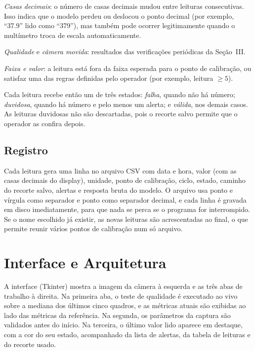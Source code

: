 \documentclass[10pt,twocolumn,letterpaper]{article}
\begin{document}
\textit{Casas decimais}: o número de casas decimais mudou entre leituras
consecutivas. Isso indica que o modelo perdeu ou deslocou o ponto decimal (por
exemplo, ``37.9'' lido como ``379''), mas também pode ocorrer legitimamente
quando o multímetro troca de escala automaticamente.

\textit{Qualidade} e \textit{câmera movida}: resultados das verificações
periódicas da Seção~III.

\textit{Faixa e valor}: a leitura está fora da faixa esperada para o ponto de
calibração, ou satisfaz uma das regras definidas pelo operador (por exemplo,
leitura $\ge 5$).

Cada leitura recebe então um de três estados: \textit{falha}, quando não há
número; \textit{duvidosa}, quando há número e pelo menos um alerta; e
\textit{válida}, nos demais casos. As leituras duvidosas não são descartadas,
pois o recorte salvo permite que o operador as confira depois.

\subsection{Registro}

Cada leitura gera uma linha no arquivo CSV com data e hora, valor (com as casas
decimais do display), unidade, ponto de calibração, ciclo, estado, caminho do
recorte salvo, alertas e resposta bruta do modelo. O arquivo usa ponto e
vírgula como separador e ponto como separador decimal, e cada linha é gravada
em disco imediatamente, para que nada se perca se o programa for interrompido.
Se o nome escolhido já existir, as novas leituras são acrescentadas ao final,
o que permite reunir vários pontos de calibração num só arquivo.

\section{Interface e Arquitetura}

A interface (Tkinter) mostra a imagem da câmera à esquerda e as três abas de
trabalho à direita. Na primeira aba, o teste de qualidade é executado ao vivo
sobre a mediana dos últimos cinco quadros, e as métricas atuais são exibidas ao
lado das métricas da referência. Na segunda, os parâmetros da captura são
validados antes do início. Na terceira, o último valor lido aparece em
destaque, com a cor do seu estado, acompanhado da lista de alertas, da tabela
de leituras e do recorte usado.
\end{document}
